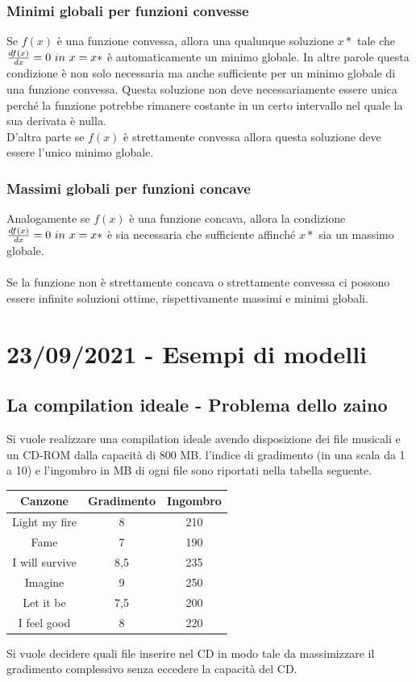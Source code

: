 \documentclass[12pt,a4paper]{article}
\begin{document}
\subsubsection{Minimi globali per funzioni convesse}
Se $f(x)$ è una funzione convessa, allora una qualunque soluzione $x*$ tale che ${df(x) \over dx} = 0 \ in \ x=x*$ è automaticamente un minimo globale. In altre parole questa condizione è non solo necessaria ma anche sufficiente per un minimo globale di una funzione convessa. Questa soluzione non deve necessariamente essere unica perché la funzione potrebbe rimanere costante in un certo intervallo nel quale la sua derivata è nulla.\\
D’altra parte se $f(x)$ è strettamente convessa allora questa soluzione deve essere l’unico minimo globale.

\subsubsection{Massimi globali per funzioni concave}
Analogamente se $f(x)$ è una funzione concava, allora la condizione ${df(x) \over dx} = 0 \ in \ x=x*$ è sia necessaria che sufficiente affinché $x*$ sia un massimo globale.\\
\\
Se la funzione non è strettamente concava o strettamente convessa ci possono essere infinite soluzioni ottime, rispettivamente massimi e minimi globali.

\clearpage
\section{23/09/2021 - Esempi di modelli}
\subsection{La compilation ideale - Problema dello zaino}
Si vuole realizzare una compilation ideale avendo disposizione dei file musicali e un CD-ROM dalla capacità di 800 MB. l’indice di gradimento (in una scala da 1 a 10) e l’ingombro in MB di ogni file sono riportati nella tabella seguente.\\
\begin{center}
\begin{tabular}{|c|c|c|}
\hline
Canzone & Gradimento & Ingombro\\
\hline
Light my fire & 8 & 210\\
Fame & 7 &190\\
I will survive & 8,5 & 235\\
Imagine &9 &250\\
Let it be &7,5& 200\\
I feel good &8 &220\\
\hline
\end{tabular}
\end{center}
Si vuole decidere quali file inserire nel CD in modo tale da massimizzare il gradimento complessivo senza eccedere la capacità del CD.\\
\\
\end{document}
